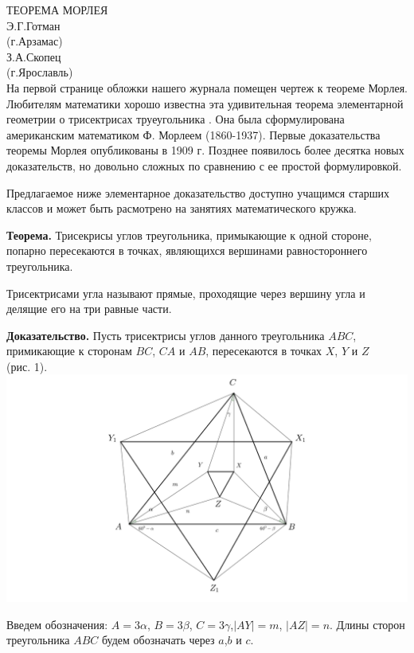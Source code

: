 \documentclass{article}
\begin{document}
\pagestyle{fancy}
ТЕОРЕМА МОРЛЕЯ
\\Э.Г.Готман
\\(г.Арзамас)
\\З.А.Скопец
\\(г.Ярославль)
\\На первой странице обложки нашего журнала помещен чертеж к теореме Морлея. Любителям математики хорошо известна эта удивительная теорема элементарной геометрии о трисектрисах труеугольника . Она была сформулирована американским математиком Ф. Морлеем (1860-1937). Первые доказательства теоремы Морлея опубликованы в 1909 г. Позднее появилось более десятка новых доказательств, но довольно сложных по сравнению с ее простой формулировкой.
\par Предлагаемое ниже элементарное доказательство доступно учащимся старших классов и может быть расмотрено на занятиях математического кружка. 
\par \textbf{Теорема.}  Трисекрисы углов треугольника, примыкающие к одной стороне, попарно пересекаются в точках, являющихся вершинами равностороннего треугольника. 
\par Трисектрисами угла называют прямые, проходящие через вершину угла и делящие его на три равные части. 
\par \textbf{Доказательство.} Пусть трисектрисы углов данного треугольника $ABC$, примикающие к сторонам $BC$, $CA$ и $AB$, пересекаются в точках $X$, $Y$ и $Z$ \\ (рис. 1). 
\\
\includegraphics[scale=0.25]{morley2.png}
\\
\par Введем обозначения: $A=3\alpha$, $B=3\beta$, $C=3\gamma$,$ \mid AY \mid=m$, $\mid AZ\mid=n$. Длины сторон треугольника $ABC$ будем обозначать через $a$,$b$ и $c$.
\end{document}
